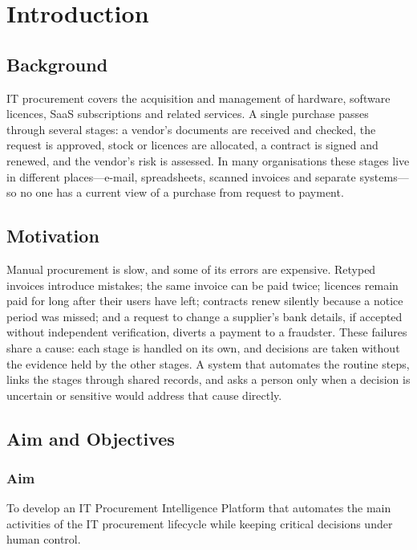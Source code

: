 
\chapter[Introduction]{\centering Introduction}\label{chap1}
\newpage

\section{Background}
IT procurement covers the acquisition and management of hardware, software licences, SaaS subscriptions and related services. A single purchase passes through several stages: a vendor's documents are received and checked, the request is approved, stock or licences are allocated, a contract is signed and renewed, and the vendor's risk is assessed. In many organisations these stages live in different places---e-mail, spreadsheets, scanned invoices and separate systems---so no one has a current view of a purchase from request to payment.

\section{Motivation}
Manual procurement is slow, and some of its errors are expensive. Retyped invoices introduce mistakes; the same invoice can be paid twice; licences remain paid for long after their users have left; contracts renew silently because a notice period was missed; and a request to change a supplier's bank details, if accepted without independent verification, diverts a payment to a fraudster. These failures share a cause: each stage is handled on its own, and decisions are taken without the evidence held by the other stages. A system that automates the routine steps, links the stages through shared records, and asks a person only when a decision is uncertain or sensitive would address that cause directly.

\section{Aim and Objectives}

\subsection{Aim}
To develop an IT Procurement Intelligence Platform that automates the main activities of the IT procurement lifecycle while keeping critical decisions under human control.

